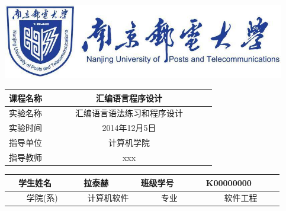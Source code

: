 \documentclass[a4paper,12pt]{article}
\begin{document}
\begin{titlepage}
    \begin{center}
    \phantom{Start!}
	\vspace{2cm}
	\includegraphics[width=350pt]{nanyou_icon.jpg} \\
      \vspace{3.5cm}
      \begin{table}[!hbp]
      \centering
      \renewcommand\arraystretch{1.5}
     	\begin{tabular}{|c|c|}
     		\hline
     		课程名称 & 汇编语言程序设计 \\
     		\hline
     		实验名称 & ~~~~~~汇编语言语法练习和程序设计~~~~~~ \\
     		\hline
     		实验时间&\multicolumn{1}{c|}{2014年12月5日}\\
     		\hline
     		指导单位 & 计算机学院 \\
     		\hline
     		指导教师 & xxx \\
     		\hline
     		\end{tabular}     		
       \end{table}
       \vspace{3cm}
      \begin{table}[!hbp]
      \centering
      \renewcommand\arraystretch{1.5}
     	\begin{tabular}{|c|c|c|c|}
     		\hline
     		\qquad ~~学生姓名~~~~~  & \qquad 拉泰赫~~~~~ & \qquad 班级学号~~~~~ & \qquad K00000000~~~~~ \\
     		\hline
     		学院(系) & 计算机软件 & 专业 & 软件工程 \\
     		\hline
     		\end{tabular}
       \end{table}
     \end{center}
\end{titlepage}
\end{document}
